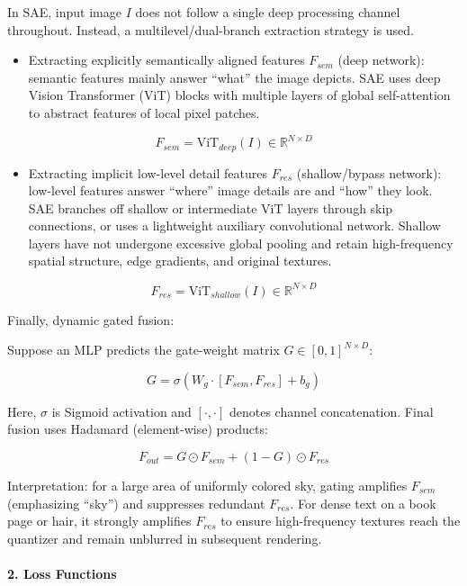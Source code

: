 In SAE, input image \(I\) does not follow a single deep processing channel throughout. Instead, a multilevel/dual-branch extraction strategy is used.

\begin{itemize}
\tightlist
\item
  Extracting explicitly semantically aligned features \(F_{sem}\) (deep network): semantic features mainly answer ``what'' the image depicts. SAE uses deep Vision Transformer (ViT) blocks with multiple layers of global self-attention to abstract features of local pixel patches.
\end{itemize}

\[
F_{sem}=\mathrm{ViT}_{deep}(I)\in \mathbb{R}^{N\times D}
\]

\begin{itemize}
\tightlist
\item
  Extracting implicit low-level detail features \(F_{res}\) (shallow/bypass network): low-level features answer ``where'' image details are and ``how'' they look. SAE branches off shallow or intermediate ViT layers through skip connections, or uses a lightweight auxiliary convolutional network. Shallow layers have not undergone excessive global pooling and retain high-frequency spatial structure, edge gradients, and original textures.
\end{itemize}

\[
F_{res}=\mathrm{ViT}_{shallow}(I)\in \mathbb{R}^{N\times D}
\]

Finally, dynamic gated fusion:

Suppose an MLP predicts the gate-weight matrix \(G\in[0,1]^{N\times D}\):

\[
G=\sigma(W_g\cdot [F_{sem},F_{res}]+b_g)
\]

Here, \(\sigma\) is Sigmoid activation and \([\cdot,\cdot]\) denotes channel concatenation. Final fusion uses Hadamard (element-wise) products:

\[
F_{out}=G\odot F_{sem}+(1-G)\odot F_{res}
\]

Interpretation: for a large area of uniformly colored sky, gating amplifies \(F_{sem}\) (emphasizing ``sky'') and suppresses redundant \(F_{res}\). For dense text on a book page or hair, it strongly amplifies \(F_{res}\) to ensure high-frequency textures reach the quantizer and remain unblurred in subsequent rendering.

\hypertarget{loss-functions}{%
\paragraph{2. Loss Functions}\label{loss-functions}}

